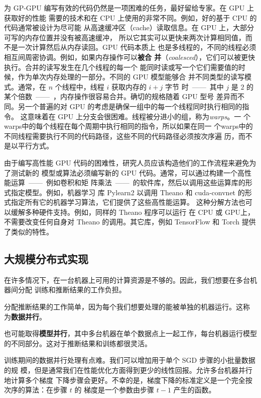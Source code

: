 为 GP-GPU 编写有效的代码仍然是一项困难的任务，最好留给专家。在 GPU 上获取好的性能
需要的技术和在 CPU 上使用的非常不同。例如，好的基于 CPU 的代码通常被设计为尽可能
从高速缓冲区（cache）读取信息。在 GPU 上，大部分可写的内存位置并没有被高速缓冲，
所以它其实可以更快来两次计算相同值，而不是一次计算然后从内存读回。GPU 代码本质上
也是多线程的，不同的线程必须相互间周密协调。例如，如果内存操作可以\textbf{被合
  并}（\textit{coalesced}），它们可以被更快执行。合并的读写发生在几个线程的每一个
能同时读或写一个它们需要值的时候，作为单次内存处理的一部分。不同的 GPU 模型能够合
并不同类型的读写模式。通常，在 $n$ 个线程中，线程 $i$ 获取内存的 $i + j$ 字节
时~——~其中 $j$ 是 $2$ 的某个倍数~——~，内存操作很容易合并。确切的规格随着 GPU 型号
差异而不同。另一个普遍的对 GPU 的考虑是确保一组中的每一个线程同时执行相同的指令。
这意味着在 GPU 上分支会很困难。线程被分进小的组，称为\emph{\gls{warps}}。一
个\gls*{warps}中的每个线程在每个周期中执行相同的指令，所以如果在同一
个\gls*{warps}中的不同线程需要执行不同的代码路径，这些不同的代码路径必须按次序遍
历，而不是以平行方式。

由于编写高性能 GPU 代码的困难性，研究人员应该构造他们的工作流程来避免为了测试新的
模型或算法必须编写新的 GPU 代码。通常，可以通过构建一个高性能运算~——~例如卷积和矩
阵乘法~——~的软件库，然后以调用这些运算库的形式指定模型。例如，机器学习
库 Pylearn2 \citep{Goodfellow+al-ICML2013-small} 以调用 Theano
\citep{bergstra+al:2010-scipy-short,Bastien-2012} 和 cuda-convnet
\citep{Krizhevsky2010tr} 的形式指定所有它的机器学习算法，它们提供了这些高性能运算。
这种分解方法也可以缓解多种硬件支持。例如，同样的 Theano 程序可以运行
在 CPU 或 GPU上，不需要改变任何自身对 Theano 的调用。其它库，例如 TensorFlow
\citep{tensorflow} 和 Torch \citep{Collobert-AISTATS2011} 提供了类似的特性。

\subsection{大规模分布式实现}
\label{subsec:large_scale_distributed_implementations}

在许多情况下，在一台机器上可用的计算资源是不够的。因此，我们想要在多台机器间分配
训练和推断结果的工作负担。

分配推断结果的工作简单，因为每个我们想要处理的能被单独的机器运行。这称
为\textbf{数据并行}。

也可能取得\textbf{模型并行}，其中多台机器在单个数据点上一起工作，每台机器运行模型
的不同部分。这对于推断结果和训练都很灵活。

训练期间的数据并行处理有点难。我们可以增加用于单个 \gls{SGD} 步骤的小批量数据的规
模，但是通常我们在性能优化方面得到更少的线性回报。允许多台机器并行地计算多个梯度
下降步骤会更好。不幸的是，梯度下降的标准定义是一个完全按次序的算法：在步骤 $t$ 的
梯度是一个参数由步骤 $t-1$ 产生的函数。

